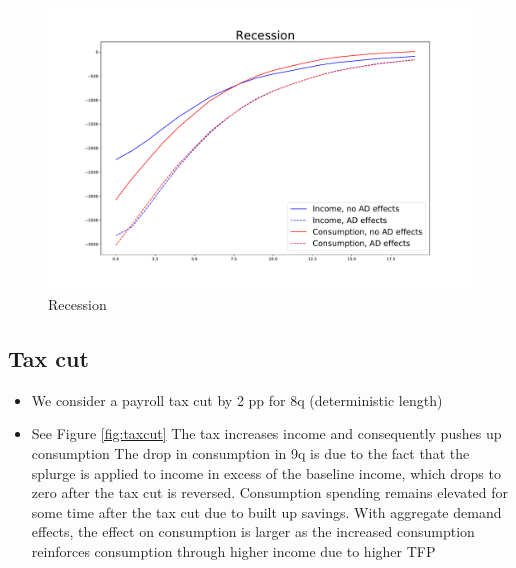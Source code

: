 \documentclass[]{article}
\begin{document}
\begin{figure} 
	\begin{centering}
		\includegraphics[width=\linewidth]{../50kSample_BaseCal/recession.pdf}
		\caption{Recession}
		\label{fig:recession}
	\end{centering}
\end{figure}

\FloatBarrier
\subsection{Tax cut}

\begin{itemize}
	\item We consider a payroll tax cut by 2 pp for 8q (deterministic length)
	\item See Figure \ref{fig:taxcut}
	\subitem The tax increases income and consequently pushes up consumption
	\subitem The drop in consumption in 9q is due to the fact that the splurge is applied to income in excess of the baseline income, which drops to zero after the tax cut is reversed. Consumption spending remains elevated for some time after the tax cut due to built up savings. 
	\subitem With aggregate demand effects, the effect on consumption is larger as the increased consumption reinforces consumption through higher income due to higher TFP	
\end{itemize}
\end{document}
